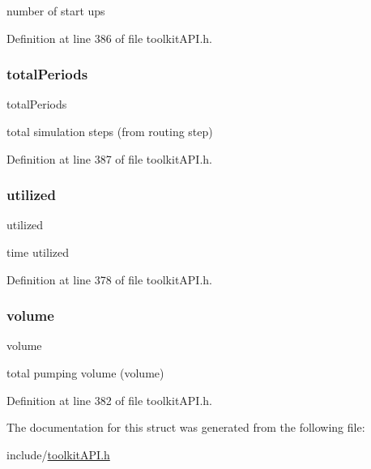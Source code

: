 number of start ups 

Definition at line 386 of file toolkit\+A\+P\+I.\+h.

\mbox{\label{struct_s_m___pump_stats_a60fffeca33e0487e4b7cac3898b2cf05}} 
\subsubsection{\texorpdfstring{total\+Periods}{totalPeriods}}
{\footnotesize\ttfamily total\+Periods}

total simulation steps (from routing step) 

Definition at line 387 of file toolkit\+A\+P\+I.\+h.

\mbox{\label{struct_s_m___pump_stats_a200b170f07df6efeaa5aad98ef34a488}} 
\subsubsection{\texorpdfstring{utilized}{utilized}}
{\footnotesize\ttfamily utilized}

time utilized 

Definition at line 378 of file toolkit\+A\+P\+I.\+h.

\mbox{\label{struct_s_m___pump_stats_a9bc498ccac8db41438f855f5dd3f4c05}} 
\subsubsection{\texorpdfstring{volume}{volume}}
{\footnotesize\ttfamily volume}

total pumping volume (volume) 

Definition at line 382 of file toolkit\+A\+P\+I.\+h.



The documentation for this struct was generated from the following file\+:\begin{DoxyCompactItemize}
\item 
include/\hyperlink{toolkit_a_p_i_8h}{toolkit\+A\+P\+I.\+h}\end{DoxyCompactItemize}

